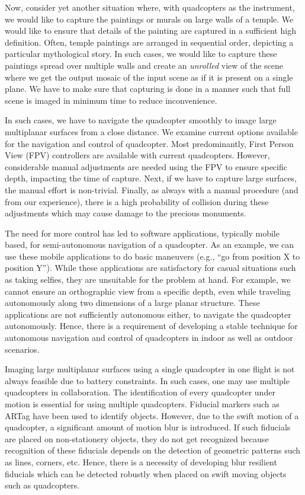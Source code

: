 Now, consider yet another situation where, with quadcopters as the
instrument, we would like to capture the paintings or murals on large
walls of a temple. We would like to ensure that details of the
painting are captured in a sufficient high definition. Often, temple
paintings are arranged in sequential order, depicting a particular
mythological story. In such cases, we would like to capture these
paintings spread over multiple walls and create an \emph{unrolled}
view of the scene where we get the output mosaic of the input scene as if it is
present on a single plane.  We have to make sure that capturing is done in a
manner such that full scene is imaged in minimum time to reduce inconvenience.

In such cases, we have to navigate the quadcopter smoothly to image
large multiplanar surfaces from a close distance. We examine current
options available for the navigation and control of quadcopter.  Most
predominantly, First Person View (FPV) controllers are available with
current quadcopters. However, considerable manual adjustments are
needed using the FPV to ensure specific depth, impacting the time of
capture. Next, if we have to capture large surfaces, the manual effort
is non-trivial.  Finally, as always with a manual procedure (and from
our experience), there is a high probability of collision during
these adjustments which may cause damage to the precious monuments.

The need for more control has led to software applications, typically
mobile based, for semi-autonomous navigation of a quadcopter.  As an
example, we can use these mobile applications to do basic maneuvers
(e.g., ``go from position X to position Y''). While these applications
are satisfactory for casual situations such as taking selfies, they
are unsuitable for the problem at hand.  For example, we cannot ensure
an orthographic view from a specific depth, even while traveling
autonomously along two dimensions of a large planar structure.  These
applications are not sufficiently autonomous either, to navigate the
quadcopter autonomously. Hence, there is a requirement of developing a
stable technique for autonomous navigation and control of quadcopters
in indoor as well as outdoor scenarios.
 
Imaging large multiplanar surfaces using a single quadcopter in one
flight is not always feasible due to battery constraints. In such
cases, one may use multiple quadcopters in collaboration. The
identification of every quadcopter under motion is essential for using
multiple quadcopters. Fiducial markers such as ARTag have been used to
identify objects. However, due to the swift motion of a quadcopter, a
significant amount of motion blur is introduced. If such fiducials are
placed on non-stationery objects, they do not get recognized because
recognition of these fiducials depends on the detection of geometric
patterns such as lines, corners, etc.  Hence, there is a necessity of
developing blur resilient fiducials which can be detected robustly
when placed on swift moving objects such as quadcopters.

